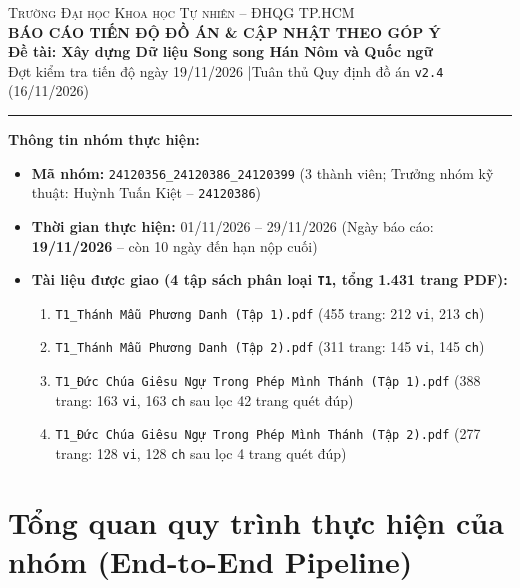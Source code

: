 \documentclass[12pt,a4paper]{article}
\begin{document}
\begin{center}
    {\small\textsc{Trường Đại học Khoa học Tự nhiên -- ĐHQG TP.HCM}}\\[0.3em]
    {\LARGE\bfseries\color{primaryblue} BÁO CÁO TIẾN ĐỘ ĐỒ ÁN \& CẬP NHẬT THEO GÓP Ý}\\[0.4em]
    {\large\textbf{Đề tài: Xây dựng Dữ liệu Song song Hán Nôm và Quốc ngữ}}\\[0.3em]
    {\normalsize\color{mutedgray} Đợt kiểm tra tiến độ ngày 19/11/2026 \quad|\quad Tuân thủ Quy định đồ án \texttt{v2.4} (16/11/2026)}
\end{center}

\vspace{0.5em}
\hrule
\vspace{0.8em}

\noindent\textbf{Thông tin nhóm thực hiện:}
\begin{itemize}[leftmargin=1.5em, itemsep=0.2em]
    \item \textbf{Mã nhóm:} \texttt{24120356\_24120386\_24120399} (3 thành viên; Trưởng nhóm kỹ thuật: Huỳnh Tuấn Kiệt -- \texttt{24120386})
    \item \textbf{Thời gian thực hiện:} 01/11/2026 -- 29/11/2026 (Ngày báo cáo: \textbf{19/11/2026} -- còn 10 ngày đến hạn nộp cuối)
    \item \textbf{Tài liệu được giao (4 tập sách phân loại \texttt{T1}, tổng 1.431 trang PDF):}
    \begin{enumerate}[leftmargin=1.5em, itemsep=0.15em]
        \item \texttt{T1\_Thánh Mẫu Phương Danh (Tập 1).pdf} (455 trang: 212 \texttt{vi}, 213 \texttt{ch})
        \item \texttt{T1\_Thánh Mẫu Phương Danh (Tập 2).pdf} (311 trang: 145 \texttt{vi}, 145 \texttt{ch})
        \item \texttt{T1\_Đức Chúa Giêsu Ngự Trong Phép Mình Thánh (Tập 1).pdf} (388 trang: 163 \texttt{vi}, 163 \texttt{ch} sau lọc 42 trang quét đúp)
        \item \texttt{T1\_Đức Chúa Giêsu Ngự Trong Phép Mình Thánh (Tập 2).pdf} (277 trang: 128 \texttt{vi}, 128 \texttt{ch} sau lọc 4 trang quét đúp)
    \end{enumerate}
\end{itemize}

\section{Tổng quan quy trình thực hiện của nhóm (End-to-End Pipeline)}
\end{document}

